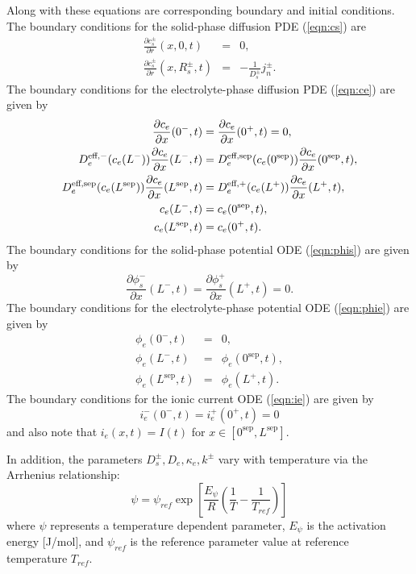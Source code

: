 \documentclass[12pt]{article}
\newcommand{\eff}{\text{eff}}
\newcommand{\pard}[2]{\frac{\partial #1}{\partial #2}}
\begin{document}
Along with these equations are corresponding boundary and initial conditions. The boundary conditions for the solid-phase diffusion PDE (\ref{eqn:cs}) are
\begin{eqnarray}
	\frac{\partial c_{s}^{\pm}}{\partial r}(x,0,t) &=& 0, \label{eqn:cs-bc1} \\
	\frac{\partial c_{s}^{\pm}}{\partial r}(x,R_{s}^{\pm},t) &=& -\frac{1}{D_{s}^{\pm}} j_{n}^{\pm} \label{eqn:cs-bc2}.
\end{eqnarray}
The boundary conditions for the electrolyte-phase diffusion PDE (\ref{eqn:ce}) are given by
\begin{align}
	\pard{c_{e}}{x}(0^{-},t) &= \pard{c_{e}}{x}(0^{+},t) = 0, \label{eqn:ce-bc1} \\
	D_{e}^{\eff,-}(c_e(L^{-})) \pard{c_{e}}{x}(L^{-},t) &= D_{e}^{\eff,\textrm{sep}}(c_e(0^{\textrm{sep}})) \pard{c_{e}}{x}(0^{\textrm{sep}},t), \\
	D_{e}^{\textrm{\eff,sep}}(c_e(L^{\textrm{sep}})) \pard{c_{e}}{x}(L^{\textrm{sep}},t) &= D_{e}^{\eff,+}(c_e(L^{+})) \pard{c_{e}}{x}(L^{+},t), \\
	c_{e}(L^{-},t) &= c_{e}(0^{\textrm{sep}},t), \\
	c_{e}(L^{\textrm{sep}},t) &= c_{e}(0^+,t). \label{eqn:ce-bc5}
\end{align}
The boundary conditions for the solid-phase potential ODE (\ref{eqn:phis}) are given by
\begin{equation}\label{eqn:phis-bc}
	\pard{\phi_{s}^{-}}{x}(L^{-},t) = \pard{\phi_{s}^{+}}{x}(L^{+},t) = 0.
\end{equation}
The boundary conditions for the electrolyte-phase potential ODE (\ref{eqn:phie}) are given by
\begin{eqnarray}
	\phi_{e}(0^{-},t) &=& 0, \\
	\phi_{e}(L^{-},t) &=& \phi_{e}(0^{\textrm{sep}},t), \\
	\phi_{e}(L^{\textrm{sep}},t) &=& \phi_{e}(L^+,t).
\end{eqnarray}
The boundary conditions for the ionic current ODE (\ref{eqn:ie}) are given by
\begin{equation}\label{eqn:ie-bcs}
	i_{e}^{-}(0^{-},t) = i_{e}^{+}(0^+,t) = 0
\end{equation}
and also note that $i_{e}(x,t) = I(t)$ for $x \in [0^{\textrm{sep}}, L^{\textrm{sep}}]$.

In addition, the parameters $D_s^{\pm}, D_e, \kappa_e, k^{\pm}$ vary with temperature via the Arrhenius relationship:
\begin{equation}\label{eqn:arrhenius}
	\psi = \psi_{ref} \exp \left[\frac{E_\psi}{R} \left( \frac{1}{T} - \frac{1}{T_{ref}} \right) \right]
\end{equation}
where $\psi$ represents a temperature dependent parameter, $E_{\psi}$ is the activation energy [J/mol], and $\psi_{ref}$ is the reference parameter value at reference temperature $T_{ref}$.
\end{document}
